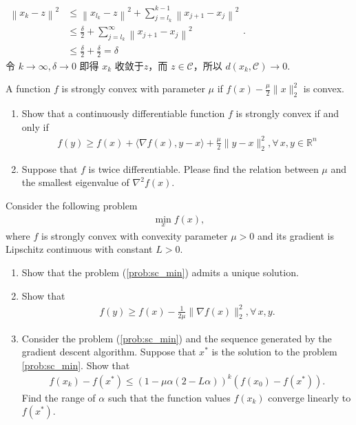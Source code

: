 \documentclass[11pt,letter,notitlepage]{article}
\begin{document}
\begin{solution}
\begin{enumerate}
        $\begin{aligned}\left\|x_{k}-z\right\|^{2} & \leqslant\left\|x_{l_k}-z\right\|^{2}+\sum_{j=l_k}^{k-1}\left\|x_{j+1}-x_{j}\right\|^{2} \\ & \leqslant \frac{\delta}{2}+\sum_{j=l_k}^{\infty}\left\|x_{j+1}-x_{j}\right\|^{2} \\ & \leqslant \frac{\delta}{2}+\frac{\delta}{2}=\delta \end{aligned}$.\\
        令 $k\rightarrow\infty, \delta \rightarrow 0$ 即得 $x_k$ 收敛于$z$，而 $z \in \mathcal{C}$，所以 $d(x_k,\mathcal{C})\rightarrow 0$.
    \end{enumerate}
\end{solution}
\newpage



\begin{exercise}
A function $f$ is strongly convex with parameter $\mu$ if $f(x)-\frac{\mu}{2}\|x\|_2^2$ is convex.
\begin{enumerate}
    \item Show that a continuously differentiable function $f$ is strongly convex if and only if 
    \begin{align*}
        f(y)\ge f(x)+\langle\nabla f(x),y-x\rangle+\frac{\mu}{2}\|y-x\|_2^2, \forall\, x,y\in\mathbb{R}^n
    \end{align*}
    \item Suppose that $f$ is twice differentiable. Please find the relation between $\mu$ and the smallest eigenvalue of $\nabla^2f(x)$.
\end{enumerate}

\noindent Consider the following problem 
\begin{align}\label{prob:sc_min}
    \min_{x}f(x),
\end{align}
where $f$ is strongly convex with convexity parameter $\mu>0$ and its gradient is Lipschitz continuous with constant $L>0$.
\begin{enumerate}[resume]
    \item Show that the problem (\ref{prob:sc_min}) admits a unique solution.
    \item Show that
    \begin{align*}
        f(y)\ge f(x)-\frac{1}{2\mu}\|\nabla f(x)\|_2^2, \forall\, x,y.
    \end{align*}
    \item Consider the problem (\ref{prob:sc_min}) and the sequence generated by the gradient descent algorithm. Suppose that $x^*$ is the solution to the problem \ref{prob:sc_min}. Show that
    \begin{align*}
        f(x_k)-f(x^*)\le (1-\mu\alpha(2-L\alpha))^k(f(x_0)-f(x^*)).
    \end{align*}
    Find the range of $\alpha$ such that the function values $f(x_k)$ converge linearly to  $f(x^*)$.
\end{enumerate}
\end{exercise}
\end{document}
